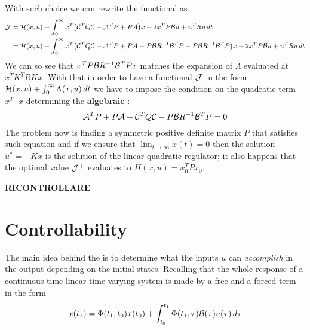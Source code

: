 	With such choice we can rewrite the functional as
	\begin{align*}
		\mathcal{J} & = \mathcal H(x,u) + \int_0^\infty x^T\big(\mathcal{C}^T Q \mathcal{C} + \mathcal{A}^T P + PA \big) x + 2 x^T P \mathcal{B} u + u^T R u\, dt \\
		& = \mathcal H(x,u) + \int_0^\infty x^T\big(\mathcal{C}^T Q \mathcal{C} + \mathcal{A}^T P + PA + P \mathcal{B} R^{-1} \mathcal{B}^TP - P \mathcal{B} R^{-1} \mathcal{B}^TP \big) x + 2 x^T P \mathcal{B} u + u^T R u\, dt
	\end{align*}
	We can so see that $x^T P \mathcal{B} R^{-1} \mathcal{B}^TP x$ matches the expansion of $\Lambda$ evaluated at $x^T K^T R K x$. With that in order to have a functional $\mathcal{J}$ in the form $\mathcal H(x,u) + \int_0^\infty \Lambda(x,u)\, dt$ we have to impose the condition on the quadratic term $x^T\cdot x$ determining the  \textbf{algebraic} :
	\begin{equation}
		\mathcal{A}^T P + P \mathcal{A} + \mathcal{C}^T Q \mathcal{C} - P \mathcal{B} R^{-1} \mathcal{B}^T P = 0
	\end{equation}
	The problem now is finding a symmetric positive definite matrix $P$ that satisfies such equation and if we ensure that $\lim_{t\rightarrow\infty}x(t) = 0$ then the solution $u^* = - Kx$ is the solution of the linear quadratic regulator; it also happens that the optimal value $\mathcal{J}^+$ evaluates to $H(x,u) = x_0^T P x_0$.		
	
	\textbf{RICONTROLLARE}
	
\section{Controllability}	
	The main idea behind the  is to determine what the inputs $u$ can \textit{accomplish} in the output depending on the initial states. Recalling that the whole response of a continuous-time linear time-varying system is made by a free and a forced term in the form
	\[ x(t_1) = \Phi(t_1,t_0) x(t_0) + \int_{t_0}^{t_1} \Phi(t_1,\tau) \mathcal{B} (\tau) u(\tau) \, d\tau \]
	
